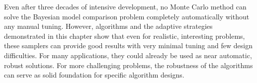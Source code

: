 Even after three decades of intensive development, no Monte Carlo method can solve the Bayesian model comparison problem completely automatically without any manual tuning. However, \smc algorithms and the adaptive strategies demonstrated in this chapter show that even for realistic, interesting problems, these samplers can provide good results with very minimal tuning and few design difficulties. For many applications, they could already be used as near automatic, robust solutions. For more challenging problems, the robustness of the algorithms can serve as solid foundation for specific algorithm designs.
